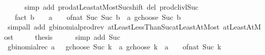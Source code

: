 \begin{isabellebody}
\ \ \ \ \isamarkupfalse%
\ {\isacharparenleft}{\kern0pt}simp\ add{\isacharcolon}{\kern0pt}\ prod{\isachardot}{\kern0pt}atLeast{}{\isacharunderscore}{\kern0pt}atMost{\isacharunderscore}{\kern0pt}Suc{\isacharunderscore}{\kern0pt}shift\ del{\isacharcolon}{\kern0pt}\ prod{\isachardot}{\kern0pt}cl{\isacharunderscore}{\kern0pt}ivl{\isacharunderscore}{\kern0pt}Suc{\isacharparenright}{\kern0pt}\isanewline
\ \ \isamarkupfalse%
\ \isamarkupfalse%
\ {\isachardoublequoteopen}{\isasymdots}\ {\isacharslash}{\kern0pt}\ fact\ {\isacharparenleft}{\kern0pt}b\ {\isacharplus}{\kern0pt}\ {}{\isacharparenright}{\kern0pt}\ {\isacharequal}{\kern0pt}\ {\isacharparenleft}{\kern0pt}a\ {\isacharplus}{\kern0pt}\ {}{\isacharparenright}{\kern0pt}\ {\isacharslash}{\kern0pt}\ of{\isacharunderscore}{\kern0pt}nat\ {\isacharparenleft}{\kern0pt}Suc\ {\isacharparenleft}{\kern0pt}Suc\ b{\isacharparenright}{\kern0pt}{\isacharparenright}{\kern0pt}\ {\isacharasterisk}{\kern0pt}\ {\isacharparenleft}{\kern0pt}a\ gchoose\ Suc\ b{\isacharparenright}{\kern0pt}{\isachardoublequoteclose}\isanewline
\ \ \ \ \isamarkupfalse%
\ {\isacharparenleft}{\kern0pt}simp{\isacharunderscore}{\kern0pt}all\ add{\isacharcolon}{\kern0pt}\ gbinomial{\isacharunderscore}{\kern0pt}prod{\isacharunderscore}{\kern0pt}rev\ atLeastLessThanSuc{\isacharunderscore}{\kern0pt}atLeastAtMost\ atLeast{}AtMost{\isacharparenright}{\kern0pt}\isanewline
\ \ \isamarkupfalse%
\ \isamarkupfalse%
\ {\isacharquery}{\kern0pt}thesis\isanewline
\ \ \ \ \isamarkupfalse%
\ {\isacharparenleft}{\kern0pt}simp\ add{\isacharcolon}{\kern0pt}\ Suc{\isacharparenright}{\kern0pt}\isanewline
{}\isamarkupfalse%
%
\endisatagproof
{\isafoldproof}%
%
\isadelimproof
\isanewline
%
\endisadelimproof
\isanewline
{}\isamarkupfalse%
\ gbinomial{\isacharunderscore}{\kern0pt}rec{\isacharcolon}{\kern0pt}\ {\isachardoublequoteopen}{\isacharparenleft}{\kern0pt}{\isacharparenleft}{\kern0pt}a\ {\isacharplus}{\kern0pt}\ {}{\isacharparenright}{\kern0pt}\ gchoose\ {\isacharparenleft}{\kern0pt}Suc\ k{\isacharparenright}{\kern0pt}{\isacharparenright}{\kern0pt}\ {\isacharequal}{\kern0pt}\ {\isacharparenleft}{\kern0pt}a\ gchoose\ k{\isacharparenright}{\kern0pt}\ {\isacharasterisk}{\kern0pt}\ {\isacharparenleft}{\kern0pt}{\isacharparenleft}{\kern0pt}a\ {\isacharplus}{\kern0pt}\ {}{\isacharparenright}{\kern0pt}\ {\isacharslash}{\kern0pt}\ of{\isacharunderscore}{\kern0pt}nat\ {\isacharparenleft}{\kern0pt}Suc\ k{\isacharparenright}{\kern0pt}{\isacharparenright}{\kern0pt}{\isachardoublequoteclose}\isanewline

\end{isabellebody}
